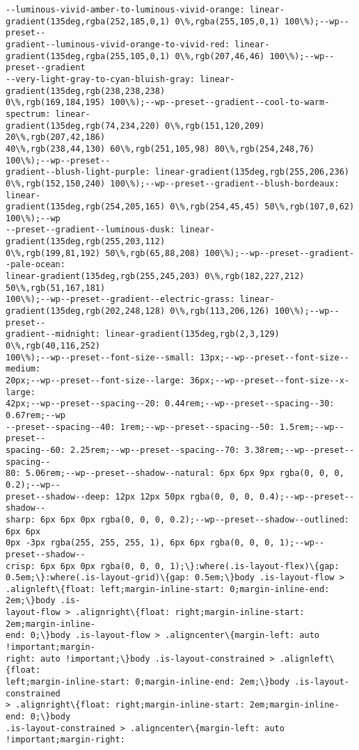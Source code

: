 \documentclass[11pt]{article}
\begin{document}
\begin{Verbatim}[commandchars=\\\{\}]
--luminous-vivid-amber-to-luminous-vivid-orange: linear-
gradient(135deg,rgba(252,185,0,1) 0\%,rgba(255,105,0,1) 100\%);--wp--preset--
gradient--luminous-vivid-orange-to-vivid-red: linear-
gradient(135deg,rgba(255,105,0,1) 0\%,rgb(207,46,46) 100\%);--wp--preset--gradient
--very-light-gray-to-cyan-bluish-gray: linear-gradient(135deg,rgb(238,238,238)
0\%,rgb(169,184,195) 100\%);--wp--preset--gradient--cool-to-warm-spectrum: linear-
gradient(135deg,rgb(74,234,220) 0\%,rgb(151,120,209) 20\%,rgb(207,42,186)
40\%,rgb(238,44,130) 60\%,rgb(251,105,98) 80\%,rgb(254,248,76) 100\%);--wp--preset--
gradient--blush-light-purple: linear-gradient(135deg,rgb(255,206,236)
0\%,rgb(152,150,240) 100\%);--wp--preset--gradient--blush-bordeaux: linear-
gradient(135deg,rgb(254,205,165) 0\%,rgb(254,45,45) 50\%,rgb(107,0,62) 100\%);--wp
--preset--gradient--luminous-dusk: linear-gradient(135deg,rgb(255,203,112)
0\%,rgb(199,81,192) 50\%,rgb(65,88,208) 100\%);--wp--preset--gradient--pale-ocean:
linear-gradient(135deg,rgb(255,245,203) 0\%,rgb(182,227,212) 50\%,rgb(51,167,181)
100\%);--wp--preset--gradient--electric-grass: linear-
gradient(135deg,rgb(202,248,128) 0\%,rgb(113,206,126) 100\%);--wp--preset--
gradient--midnight: linear-gradient(135deg,rgb(2,3,129) 0\%,rgb(40,116,252)
100\%);--wp--preset--font-size--small: 13px;--wp--preset--font-size--medium:
20px;--wp--preset--font-size--large: 36px;--wp--preset--font-size--x-large:
42px;--wp--preset--spacing--20: 0.44rem;--wp--preset--spacing--30: 0.67rem;--wp
--preset--spacing--40: 1rem;--wp--preset--spacing--50: 1.5rem;--wp--preset--
spacing--60: 2.25rem;--wp--preset--spacing--70: 3.38rem;--wp--preset--spacing--
80: 5.06rem;--wp--preset--shadow--natural: 6px 6px 9px rgba(0, 0, 0, 0.2);--wp--
preset--shadow--deep: 12px 12px 50px rgba(0, 0, 0, 0.4);--wp--preset--shadow--
sharp: 6px 6px 0px rgba(0, 0, 0, 0.2);--wp--preset--shadow--outlined: 6px 6px
0px -3px rgba(255, 255, 255, 1), 6px 6px rgba(0, 0, 0, 1);--wp--preset--shadow--
crisp: 6px 6px 0px rgba(0, 0, 0, 1);\}:where(.is-layout-flex)\{gap:
0.5em;\}:where(.is-layout-grid)\{gap: 0.5em;\}body .is-layout-flow >
.alignleft\{float: left;margin-inline-start: 0;margin-inline-end: 2em;\}body .is-
layout-flow > .alignright\{float: right;margin-inline-start: 2em;margin-inline-
end: 0;\}body .is-layout-flow > .aligncenter\{margin-left: auto !important;margin-
right: auto !important;\}body .is-layout-constrained > .alignleft\{float:
left;margin-inline-start: 0;margin-inline-end: 2em;\}body .is-layout-constrained
> .alignright\{float: right;margin-inline-start: 2em;margin-inline-end: 0;\}body
.is-layout-constrained > .aligncenter\{margin-left: auto !important;margin-right:

\end{Verbatim}
\end{document}
